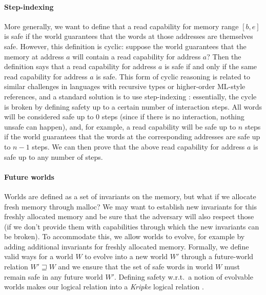 \documentclass[format=acmsmall, review=true, screen=true]{acmart}
\newcommand{\future}{\mathbin{\sqsupseteq}}
\newenvironment{toplas}{}{}
\begin{document}
\begin{toplas}
\paragraph{Step-indexing}
More generally, we want to define that a read capability for memory range
$[b,e]$ is safe if the world guarantees that the words at those addresses are
themselves safe. However, this definition is cyclic: suppose the world
guarantees that the memory at address $a$ will contain a read capability for
address $a$? Then the definition says that a read capability for address
$a$ is safe if and only if the same read capability for address $a$ is safe. This form of
cyclic reasoning is related to similar challenges in languages with recursive
types or higher-order ML-style references, and a standard solution is
to use step-indexing \citep{Appel:2001:IMR:504709.504712}: essentially, the cycle is broken by defining safety up to a
certain number of interaction steps. All words will be considered
safe up to $0$ steps (since if there is no interaction, nothing unsafe
can happen), and, for example, a read capability will be safe up to $n$
steps if the world guarantees that the words at the corresponding addresses are
safe up to $n - 1$ steps. We can then prove that the above read capability for
address $a$ is safe up to any number of steps.

\paragraph{Future worlds}
Worlds are defined as a set of invariants on the memory, but what if we
allocate fresh memory through malloc? We may want to establish new invariants
for this freshly allocated memory and be sure that the adversary will also
respect those (if we don't provide them with capabilities through which the new
invariants can be broken). To accommodate this, we allow worlds to evolve, for
example by adding additional invariants for freshly allocated memory. Formally,
we define valid ways for a world $W$ to evolve into a new world $W'$ through a
future-world relation $W' \future W$ and we ensure that the set of safe words in
world $W$ must remain safe in any future world $W'$. Defining safety w.r.t.\ a
notion of evolvable worlds makes our logical relation into a \emph{Kripke}
logical relation \citep{pitts_operational_1998}.


\end{toplas}
\end{document}
